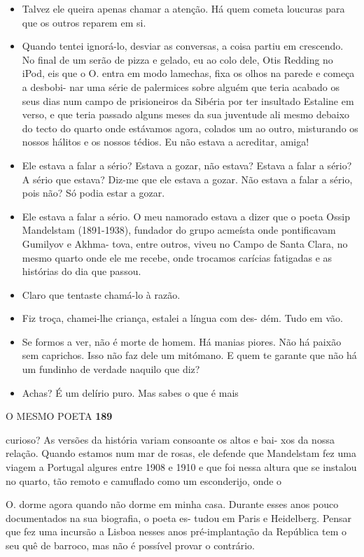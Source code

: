 \begin{itemize}
\tightlist
\item
  Talvez ele queira apenas chamar a atenção. Há quem cometa loucuras
  para que os outros reparem em si.
\item
  Quando tentei ignorá-lo, desviar as conversas, a coisa partiu em
  crescendo. No final de um serão de pizza e gelado, eu ao colo dele,
  Otis Redding no iPod, eis que o O. entra em modo lamechas, fixa os
  olhos na parede e começa a desbobi- nar uma série de palermices sobre
  alguém que teria acabado os seus dias num campo de prisioneiros da
  Sibéria por ter insultado Estaline em verso, e que teria passado
  alguns meses da sua juventude ali mesmo debaixo do tecto do quarto
  onde estávamos agora, colados um ao outro, misturando os nossos
  hálitos e os nossos tédios. Eu não estava a acreditar, amiga!
\item
  Ele estava a falar a sério? Estava a gozar, não estava? Estava a falar
  a sério? A sério que estava? Diz-me que ele estava a gozar. Não estava
  a falar a sério, pois não? Só podia estar a gozar.
\item
  Ele estava a falar a sério. O meu namorado estava a dizer que o poeta
  Ossip Mandelstam (1891-1938), fundador do grupo acmeísta onde
  pontificavam Gumilyov e Akhma- tova, entre outros, viveu no Campo de
  Santa Clara, no mesmo quarto onde ele me recebe, onde trocamos
  carícias fatigadas e as histórias do dia que passou.
\item
  Claro que tentaste chamá-lo à razão.
\item
  Fiz troça, chamei-lhe criança, estalei a língua com des- dém. Tudo em
  vão.
\item
  Se formos a ver, não é morte de homem. Há manias piores. Não há paixão
  sem caprichos. Isso não faz dele um mitómano. E quem te garante que
  não há um fundinho de verdade naquilo que diz?
\item
  Achas? É um delírio puro. Mas sabes o que é mais
\end{itemize}

O MESMO POETA \textbf{189}

curioso? As versões da história variam consoante os altos e bai- xos da
nossa relação. Quando estamos num mar de rosas, ele defende que
Mandelstam fez uma viagem a Portugal algures entre 1908 e 1910 e que foi
nessa altura que se instalou no quarto, tão remoto e camuflado como um
esconderijo, onde o

O. dorme agora quando não dorme em minha casa. Durante esses anos pouco
documentados na sua biografia, o poeta es- tudou em Paris e Heidelberg.
Pensar que fez uma incursão a Lisboa nesses anos pré-implantação da
República tem o seu quê de barroco, mas não é possível provar o
contrário.

